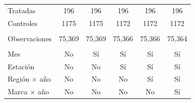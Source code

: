 \begin{tabular}{lccccc}
   Tratadas             & 196             & 196          & 196     & 196          & 196\\  
   Controles            & 1175            & 1175         & 1172    & 1172         & 1172\\  
    \\
   Observaciones        & 75,369          & 75,369       & 75,366  & 75,366       & 75,364\\  
    \\
   Mes                  & No              & Sí           & Sí      & Sí           & Sí\\  
   Estación             & No              & No           & Sí      & Sí           & Sí\\  
   Región $\times$ año  & No              & No           & No      & Sí           & Sí\\  
   Marca $\times$ año   & No              & No           & No      & No           & Sí\\  
   \bottomrule
\end{tabular}
\par\endgroup


